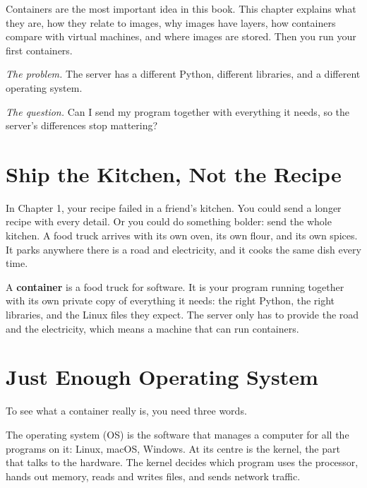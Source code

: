 
\begin{chapterintro}

Containers are the most important idea in this book. This chapter explains what they are, how they relate to images, why images have layers, how containers compare with virtual machines, and where images are stored. Then you run your first containers.

\end{chapterintro}

\emph{The problem.} The server has a different Python, different libraries, and a different operating system.

\emph{The question.} Can I send my program together with everything it needs, so the server's differences stop mattering?

\section{Ship the Kitchen, Not the Recipe}\label{02-containers-shipping-the-whole-kitchen:ship-the-kitchen-not-the-recipe}

In Chapter 1, your recipe failed in a friend's kitchen. You could send a longer recipe with every detail. Or you could do something bolder: send the whole kitchen. A food truck arrives with its own oven, its own flour, and its own spices. It parks anywhere there is a road and electricity, and it cooks the same dish every time.

A \textbf{container} is a food truck for software. It is your program running together with its own private copy of everything it needs: the right Python, the right libraries, and the Linux files they expect. The server only has to provide the road and the electricity, which means a machine that can run containers.

\section{Just Enough Operating System}\label{02-containers-shipping-the-whole-kitchen:just-enough-operating-system}

To see what a container really is, you need three words.

The operating system (OS) is the software that manages a computer for all the programs on it: Linux, macOS, Windows. At its centre is the kernel, the part that talks to the hardware. The kernel decides which program uses the processor, hands out memory, reads and writes files, and sends network traffic.

